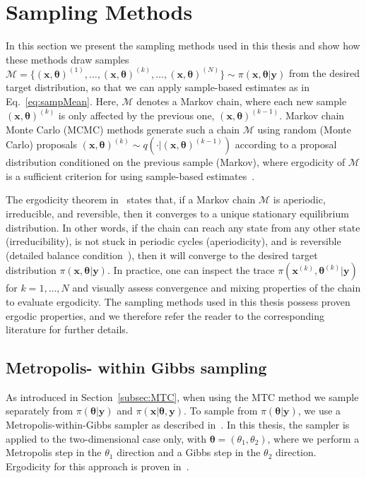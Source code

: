 \section{Sampling Methods}
\label{sec:sampling}
In this section we present the sampling methods used in this thesis and show how these methods draw samples $ \mathcal{M} = \{ (\bm{x}, \bm{\theta} )^{(1)}, \dots, (\bm{x}, \bm{\theta} )^{(k)}, \dots, (\bm{x}, \bm{\theta})^{(N)} \} \sim \pi(\bm{x}, \bm{\theta} |  \bm{y})$ from the desired target distribution, so that we can apply sample-based estimates as in Eq.~\ref{eq:sampMean}.
Here, $\mathcal{M}$ denotes a Markov chain, where each new sample $(\bm{x}, \bm{\theta})^{(k)}$ is only affected by the previous one, $(\bm{x}, \bm{\theta})^{(k-1)}$.
Markov chain Monte Carlo (MCMC) methods generate such a chain $\mathcal{M}$ using random (Monte Carlo) proposals $(\bm{x}, \bm{\theta})^{(k)} \sim q( \cdot |  (\bm{x}, \bm{\theta})^{(k-1)})$ according to a proposal distribution conditioned on the previous sample (Markov), where ergodicity of $\mathcal{M}$ is a sufficient criterion for using sample-based estimates~\cite{tan2016LecNot, roberts2004general}.

The ergodicity theorem in~\cite{tan2016LecNot} states that, if a Markov chain $\mathcal{M}$ is aperiodic, irreducible, and reversible, then it converges to a unique stationary equilibrium distribution.
In other words, if the chain can reach any state from any other state (irreducibility), is not stuck in periodic cycles (aperiodicity), and is reversible (detailed balance condition~\cite{tan2016LecNot}), then it will converge to the desired target distribution $\pi(\bm{x}, \bm{\theta} |  \bm{y})$.
In practice, one can inspect the trace $\pi(\bm{x}^{(k)}, \bm{\theta}^{(k)} |  \bm{y})$ for $k = 1, \dots, N$ and visually assess convergence and mixing properties of the chain to evaluate ergodicity.
The sampling methods used in this thesis possess proven ergodic properties, and we therefore refer the reader to the corresponding literature for further details.

\subsection{Metropolis- within Gibbs sampling}
As introduced in Section~\ref{subsec:MTC}, when using the MTC method we sample separately from $\pi(\bm{\theta} |  \bm{y})$ and $\pi(\bm{x} |  \bm{\theta}, \bm{y})$. To sample from $\pi(\bm{\theta} |  \bm{y})$, we use a Metropolis-within-Gibbs sampler as described in~\cite{fox2016fast}.
In this thesis, the sampler is applied to the two-dimensional case only, with $\bm{\theta} = (\theta_1, \theta_2)$, where we perform a Metropolis step in the $\theta_1$ direction and a Gibbs step in the $\theta_2$ direction.
Ergodicity for this approach is proven in~\cite{roberts2006harris}.

